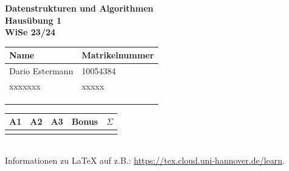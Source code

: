 \documentclass[a4paper,12pt]{scrartcl}
\def\Nr{1}					%
\def\NameA{Dario Estermann}	%
\def\MatA{10054384}			%
\def\NameB{xxxxxxx}		%
\def\MatB{xxxxx}			%
\def\NameC{}				%
\def\MatC{}					%
\def\NameD{}				%
\def\MatD{}					%
\begin{document}
\begin{center}
	\sffamily
	\bfseries
	\LARGE
	Datenstrukturen und Algorithmen\\
	\Large
	\vspace{.2\parskip}
	Hausübung \Nr\\
	\normalsize\normalfont
	WiSe 23/24
	\vspace{.2\parskip}
\end{center}

\begin{tabular}[t]{p{4.5cm} p{3cm}}
	\toprule
	Name & Matrikelnummer\\
	\midrule
	\NameA & \MatA\\
	\NameB & \MatB\\
	\ifx\NameC\empty\else\NameC & \MatC\\\fi
	\ifx\NameD\empty\else\NameD & \MatD\\\fi
	\bottomrule
\end{tabular}
\hfill
\begin{tabular}[t]{ccccc}
	\toprule
	A1 & A2 & A3 & Bonus & $\Sigma$ \\
	\midrule
	\\
	\bottomrule	
\end{tabular}
\hfill\\


Informationen zu \LaTeX{} auf z.B.: \url{https://tex.cloud.uni-hannover.de/learn}.
\end{document}
